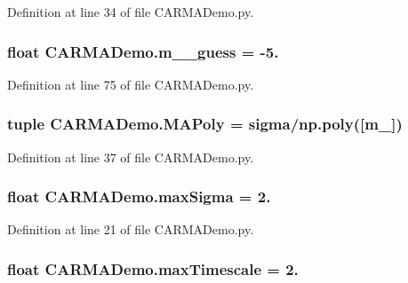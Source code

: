 Definition at line 34 of file C\-A\-R\-M\-A\-Demo.\-py.

\hypertarget{namespace_c_a_r_m_a_demo_a5734b5874a86b8f0eda0a44a74a30fed}{
\subsubsection[{m\-\_\-1\-\_\-guess}]{\setlength{\rightskip}{0pt plus 5cm}float C\-A\-R\-M\-A\-Demo.\-m\-\_\-\_\-guess = -\/5.}}\label{namespace_c_a_r_m_a_demo_a5734b5874a86b8f0eda0a44a74a30fed}


Definition at line 75 of file C\-A\-R\-M\-A\-Demo.\-py.

\hypertarget{namespace_c_a_r_m_a_demo_a75c9618722e8c9ed0413797b6ec304eb}{
\subsubsection[{M\-A\-Poly}]{\setlength{\rightskip}{0pt plus 5cm}tuple C\-A\-R\-M\-A\-Demo.\-M\-A\-Poly = {\bf sigma}/np.\-poly(\mbox{[}{\bf m\-\_}\mbox{]})}}\label{namespace_c_a_r_m_a_demo_a75c9618722e8c9ed0413797b6ec304eb}


Definition at line 37 of file C\-A\-R\-M\-A\-Demo.\-py.

\hypertarget{namespace_c_a_r_m_a_demo_a39978964538dce54fa826abcdd34836f}{
\subsubsection[{max\-Sigma}]{\setlength{\rightskip}{0pt plus 5cm}float C\-A\-R\-M\-A\-Demo.\-max\-Sigma = 2.}}\label{namespace_c_a_r_m_a_demo_a39978964538dce54fa826abcdd34836f}


Definition at line 21 of file C\-A\-R\-M\-A\-Demo.\-py.

\hypertarget{namespace_c_a_r_m_a_demo_a51a36b647ad9d55160c4fd3ebf5bb629}{
\subsubsection[{max\-Timescale}]{\setlength{\rightskip}{0pt plus 5cm}float C\-A\-R\-M\-A\-Demo.\-max\-Timescale = 2.}}\label{namespace_c_a_r_m_a_demo_a51a36b647ad9d55160c4fd3ebf5bb629}



